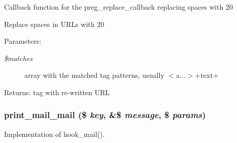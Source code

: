 Callback function for the preg\_\-replace\_\-callback replacing spaces with 20

Replace spaces in URLs with 20

\begin{Desc}
\item[Parameters:]
\begin{description}
\item[{\em \$matches}]array with the matched tag patterns, usually $<$a...$>$+text+ \end{description}
\end{Desc}
\begin{Desc}
\item[Returns:]tag with re-written URL \end{Desc}
\hypertarget{print__mail_8inc_a175d4328038cbbf573c81559f103af4}{
\subsubsection[{print\_\-mail\_\-mail}]{\setlength{\rightskip}{0pt plus 5cm}print\_\-mail\_\-mail (\$ {\em key}, \/  \&\$ {\em message}, \/  \$ {\em params})}}
\label{print__mail_8inc_a175d4328038cbbf573c81559f103af4}


Implementation of hook\_\-mail(). 